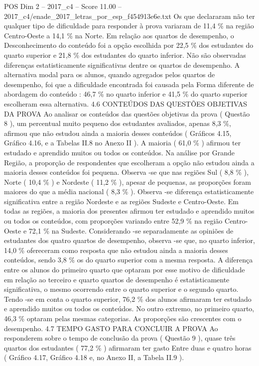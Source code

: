 \begin{textsample}{POS Dim 2 – 2017\_c4 – Score 11.00 – 2017\_c4/enade\_2017\_letras\_por\_esp\_f454913e6e.txt}
Os que declararam não ter qualquer tipo de dificuldade para responder à prova variaram de 11,4 \% na região Centro-Oeste a 14,1 \% na Norte.
Em relação aos quartos de desempenho, o Desconhecimento do conteúdo foi a opção escolhida por 22,5 \% dos estudantes do quarto superior e 21,8 \% dos estudantes do quarto inferior.
Não são observadas diferenças estatisticamente significativas dentre os quartos de desempenho.
A alternativa modal para os alunos, quando agregados pelos quartos de desempenho, foi que a dificuldade encontrada foi causada pela Forma diferente de abordagem do conteúdo : 46,7 \% no quarto inferior e 41,5 \% do quarto superior escolheram essa alternativa. 4.6 CONTEÚDOS DAS QUESTÕES OBJETIVAS DA PROVA Ao analisar os conteúdos das questões objetivas da prova ( Questão 8 ), um percentual muito pequeno dos estudantes avaliados, apenas 8,3 \%, afirmou que não estudou ainda a maioria desses conteúdos ( Gráficos 4.15, Gráfico 4.16, e a Tabelas II.8 no Anexo II ).
A maioria ( 61,0 \% ) afirmou ter estudado e aprendido muitos ou todos os conteúdos.
Na análise por Grande Região, a proporção de respondentes que escolheram a opção não estudou ainda a maioria desses conteúdos foi pequena.
Observa -se que nas regiões Sul ( 8,8 \% ), Norte ( 10,4 \% ) e Nordeste ( 11,2 \% ), apesar de pequenas, as proporções foram maiores do que a média nacional ( 8,3 \% ).
Observa -se diferença estatisticamente significativa entre a região Nordeste e as regiões Sudeste e Centro-Oeste.
Em todas as regiões, a maioria dos presentes afirmou ter estudado e aprendido muitos ou todos os conteúdos, com proporções variando entre 52,9 \% na região Centro-Oeste e 72,1 \% na Sudeste.
Considerando -se separadamente as opiniões de estudantes dos quatro quartos de desempenho, observa -se que, no quarto inferior, 14,0 \% ofereceram como resposta que não estudou ainda a maioria desses conteúdos, sendo 3,8 \% os do quarto superior com a mesma resposta.
A diferença entre os alunos do primeiro quarto que optaram por esse motivo de dificuldade em relação ao terceiro e quarto quartos de desempenho é estatisticamente significativa, o mesmo ocorrendo entre o quarto superior e o segundo quarto.
Tendo -se em conta o quarto superior, 76,2 \% dos alunos afirmaram ter estudado e aprendido muitos ou todos os conteúdos.
No outro extremo, no primeiro quarto, 46,3 \% optaram pelas mesmas categorias.
As proporções são crescentes com o desempenho. 4.7 TEMPO GASTO PARA CONCLUIR A PROVA Ao responderem sobre o tempo de conclusão da prova ( Questão 9 ), quase três quartos dos estudantes ( 77,2 \% ) afirmaram ter gasto Entre duas e quatro horas ( Gráfico 4.17, Gráfico 4.18 e, no Anexo II, a Tabela II.9 ).

\end{textsample}
